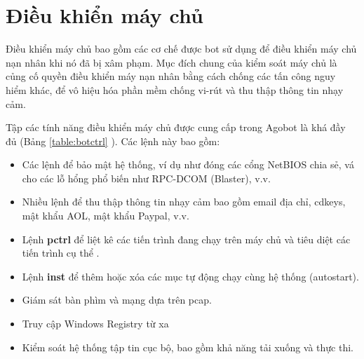 
\section{Điều khiển máy chủ}

Điều khiển máy chủ bao gồm các cơ chế được bot sử dụng để điều khiển máy chủ nạn nhân khi nó đã bị xâm phạm. Mục đích chung của kiểm soát máy chủ là củng cố quyền điều khiển máy nạn nhân bằng cách chống các tấn công nguy hiểm khác, để vô hiệu hóa phần mềm chống vi-rút và thu thập thông tin nhạy cảm.

Tập các tính năng điều khiển máy chủ được cung cấp trong Agobot là khá đầy đủ (Bảng \ref{table:botctrl} ).
Các lệnh này bao gồm:
\begin{itemize}

\item Các lệnh để bảo mật hệ thống, ví dụ như đóng các cổng NetBIOS chia sẻ,
	vá cho các lỗ hổng phổ biến như RPC-DCOM (Blaster), v.v.
\item Nhiều lệnh để thu thập thông tin nhạy cảm bao gồm email
	địa chỉ, cdkeys, mật khẩu AOL, mật khẩu Paypal, v.v.
\item Lệnh \textbf{pctrl} để liệt kê các tiến trình đang chạy trên máy chủ và
	tiêu diệt các tiến trình cụ thể .
\item Lệnh \textbf{inst} để thêm hoặc xóa các mục tự động chạy cùng hệ thống (autostart).
\item Giám sát bàn phìm và mạng dựa trên pcap.
\item Truy cập Windows Registry từ xa
\item Kiểm soát hệ thống tập tin cục bộ, bao gồm khả năng tải xuống và thực thi.
\end{itemize}

